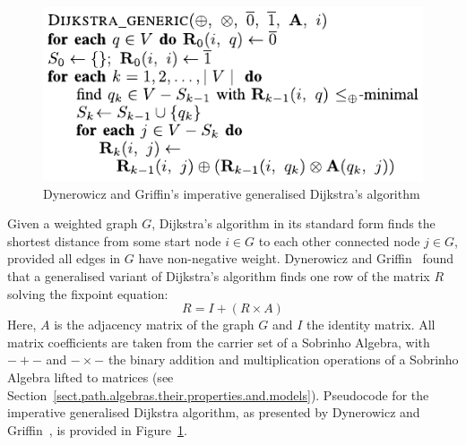 \begin{figure}[ht]
\includegraphics{algorithm.pdf}
\caption{Dynerowicz and Griffin's imperative generalised Dijkstra's algorithm}
\label{fig.algorithm}
\end{figure}

Given a weighted graph $G$, Dijkstra's algorithm in its standard form finds the shortest distance from some start node $i \in G$ to each other connected node $j \in G$, provided all edges in $G$ have non-negative weight.
Dynerowicz and Griffin~\cite{dynerowicz_forwarding_2013} found that a generalised variant of Dijkstra's algorithm finds one row of the matrix $R$ solving the fixpoint equation:
\begin{displaymath}
R = I + (R \times A)
\end{displaymath}
Here, $A$ is the adjacency matrix of the graph $G$ and $I$ the identity matrix.
All matrix coefficients are taken from the carrier set of a Sobrinho Algebra, with $-+-$ and $-\times-$ the binary addition and multiplication operations of a Sobrinho Algebra lifted to matrices (see Section~\ref{sect.path.algebras.their.properties.and.models}).
Pseudocode for the imperative generalised Dijkstra algorithm, as presented by Dynerowicz and Griffin~\cite[pg. 9]{dynerowicz_forwarding_2013}, is provided in Figure~\ref{fig.algorithm}.

